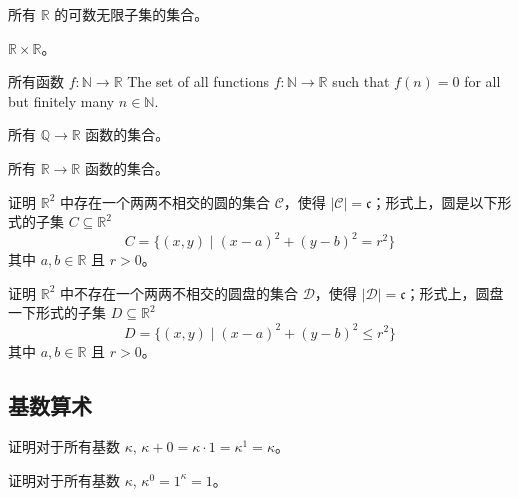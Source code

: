 \begin{chapex}
所有 $\mathbb{R}$ 的可数无限子集的集合。
\end{chapex}

\begin{chapex}
$\mathbb{R} \times \mathbb{R}$。
\end{chapex}

\begin{chapex}
所有函数 $f : \mathbb{N} \to \mathbb{R}$ 
The set of all functions $f : \mathbb{N} \to \mathbb{R}$ such that $f(n) = 0$ for all but finitely many $n \in \mathbb{N}$.
\end{chapex}

\begin{chapex}
所有 $\mathbb{Q} \to \mathbb{R}$ 函数的集合。
\end{chapex}

\begin{chapex}
\label{cqFindCardinalityEnd}
所有 $\mathbb{R} \to \mathbb{R}$ 函数的集合。
\end{chapex}

\begin{chapex}
证明 $\mathbb{R}^2$ 中存在一个两两不相交的圆的集合 $\mathcal{C}$，使得 $|\mathcal{C}| = \mathfrak{c}$；形式上，圆是以下形式的子集 $C \subseteq \mathbb{R}^2$
\[ C = \{ (x,y) \mid (x-a)^2 + (y-b)^2 = r^2 \} \]
其中 $a,b \in \mathbb{R}$ 且 $r > 0$。
\end{chapex}

\begin{chapex}
证明 $\mathbb{R}^2$ 中不存在一个两两不相交的圆盘的集合 $\mathcal{D}$，使得 $|\mathcal{D}| = \mathfrak{c}$；形式上，圆盘一下形式的子集 $D \subseteq \mathbb{R}^2$
\[ D = \{ (x,y) \mid (x-a)^2 + (y-b)^2 \le r^2 \} \]
其中 $a,b \in \mathbb{R}$ 且 $r > 0$。
\end{chapex}

\subsection*{基数算术}

\begin{chapex}
证明对于所有基数 $\kappa$, $\kappa + 0 = \kappa \cdot 1 = \kappa^1 = \kappa$。
\end{chapex}

\begin{chapex}
证明对于所有基数 $\kappa$, $\kappa^0 = 1^{\kappa} = 1$。
\end{chapex}

